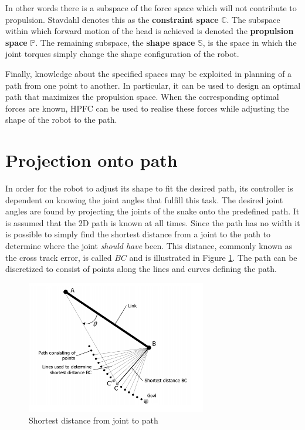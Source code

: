 In other words there is a subspace of the force space which will not contribute to propulsion. Stavdahl \cite{StavdahlNote} denotes this as the \textbf{constraint space} $\mathbb{C}$. The subspace within which forward motion of the head is achieved is denoted the \textbf{propulsion space} $\mathbb{P}$. The remaining subspace, the \textbf{shape space} $\mathbb{S}$, is the space in which the joint torques simply change the shape configuration of the robot.

Finally, knowledge about the specified spaces may be exploited in planning of a path from one point to another. In particular, it can be used to design an optimal path that maximizes the propulsion space. When the corresponding optimal forces are known, HPFC can be used to realise these forces while adjusting the shape of the robot to the path.


\section{Projection onto path}\label{sec:pathproj}
In order for the robot to adjust its shape to fit the desired path, its controller is dependent on knowing the joint angles that fulfill this task. The desired joint angles are found by projecting the joints of the snake onto the predefined path. It is assumed that the 2D path is known at all times. Since the path has no width it is possible to simply find the shortest distance from a joint to the path to determine where the joint \textit{should have} been. This distance, commonly known as the cross track error, is called $BC$ and is illustrated in Figure \ref{fig:path_proj}. The path can be discretized to consist of points along the lines and curves defining the path.

\begin{figure}[h!]
    \centering
    \includegraphics[width=0.7\textwidth]{figures/path_proj.PNG}
    \caption{Shortest distance from joint to path \cite{conkur2008path}}
    \label{fig:path_proj}
\end{figure}

